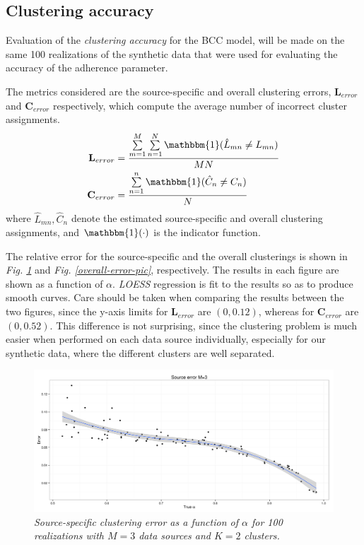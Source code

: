 \subsection{Clustering accuracy} \label{integr-synth-cluster-sect}
Evaluation of the \emph{clustering accuracy} for the BCC model, will be made on the same 100 realizations of the synthetic data that were used for evaluating the accuracy of the adherence parameter.

The metrics considered are the source-specific and overall clustering errors, $\mathbf{L}_{error}$ and $\mathbf{C}_{error}$ respectively, which compute the average number of incorrect cluster assignments. 
\begin{equation}
  \begin{aligned}
  	\mathbf{L}_{error} & = \frac{\sum\limits_{m=1}^{M}\sum\limits_{n=1}^{N}\mathbbm{1}(\hat{L}_{mn} \neq L_{mn})}{MN} \\
  	\mathbf{C}_{error} & = \frac{\sum\limits_{n=1}^{n}\mathbbm{1}(\hat{C}_{n} \neq C_{n})}{N}
  \end{aligned}
\end{equation}
where $\hat{L}_{mn}, \hat{C}_{n}$ denote the estimated source-specific and overall clustering assignments, and $\mathbbm{1}(\cdot)$ is the indicator function.

The relative error for the source-specific and the overall clusterings is shown in \emph{Fig. \ref{source-error-pic}} and \emph{Fig. \ref{overall-error-pic}}, respectively. The results in each figure are shown as a function of $\alpha$. \emph{LOESS} regression \citep{Cleveland1979} is fit to the results so as to produce smooth curves. Care should be taken when comparing the results between the two figures, since the y-axis limits for $\mathbf{L}_{error}$ are $(0,0.12)$, whereas for $\mathbf{C}_{error}$ are $(0,0.52)$. This difference is not surprising, since the clustering problem is much easier when performed on each data source individually, especially for our synthetic data, where the different clusters are well separated. 
\begin{figure}[!ht]
\begin{center}
 \includegraphics[scale = 0.39]{images/sourceError.png}
\caption{\emph{Source-specific clustering error as a function of $\alpha$ for 100 realizations with $M=3$ data sources and $K=2$ clusters.}}
\label{source-error-pic}
\end{center}
\end{figure}

